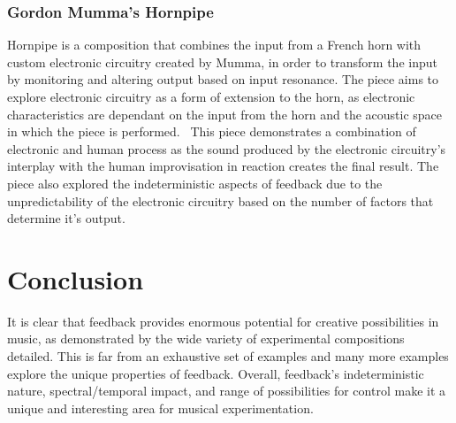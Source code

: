 \documentclass[titlepage]{scrartcl}
\begin{document}
    \subsubsection{Gordon Mumma's Hornpipe~\citeyearpar{mumma2002lem}}\label{hornpipe}
    Hornpipe is a composition that combines the input from a French horn with
    custom electronic circuitry created by Mumma, in order to transform the input by
    monitoring and altering output based on input resonance. 
    The piece aims to explore electronic circuitry as a form of extension to
    the horn, as electronic characteristics are dependant on the input from the
    horn and the acoustic space in which the piece is
    performed.~\parencite[p.101-103]{nyman1999em}
    This piece demonstrates a combination of electronic and human process as
    the sound produced by the electronic circuitry's interplay with the human
    improvisation in reaction creates the final result.
    The piece also explored the indeterministic aspects of feedback due to the
    unpredictability of the electronic circuitry based on the number of factors
    that determine it's output.

    \section{Conclusion}
    It is clear that feedback provides enormous potential for creative
    possibilities in music, as demonstrated by the wide variety of
    experimental compositions detailed. This is far from an exhaustive set of
    examples and many more examples explore the unique properties of feedback.
    Overall, feedback's indeterministic nature, spectral/temporal impact, and
    range of possibilities for control make it a unique and interesting area
    for musical experimentation.

    \printbibliography
\end{document}
